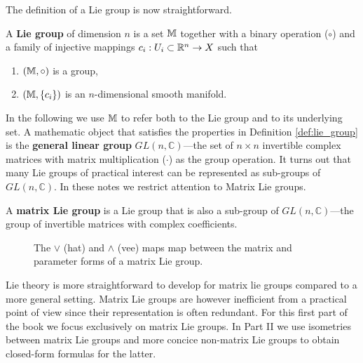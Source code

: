 
The definition of a Lie group is now straightforward.

\begin{important}
  \begin{definition}
    \label{def:lie_group}
    A \textbf{Lie group} of dimension $n$ is a set $\mathbb{M}$ together with a binary operation ($\circ$) and a family of injective mappings $c_i : U_i \subset \mathbb{R}^n \rightarrow X$ such that
    \begin{enumerate}
      \item $(\mathbb{M}, \circ)$ is a group,
      \item $(\mathbb{M}, \{ c_i \})$ is an $n$-dimensional smooth manifold.
    \end{enumerate}
  \end{definition}
\end{important}

In the following we use $\mathbb{M}$ to refer both to the Lie group and to its underlying set. A mathematic object that satisfies the properties in Definition \ref{def:lie_group} is the \textbf{general linear group} $GL(n, \mathbb{C})$---the set of $n \times n$ invertible complex matrices with matrix multiplication ($\cdot$) as the group operation. It turns out that many Lie groups of practical interest can be represented as sub-groups of $GL(n, \mathbb{C})$. In these notes we restrict attention to Matrix Lie groups.

\begin{definition}
  A \textbf{matrix Lie group} is a Lie group that is also a sub-group of $GL(n, \mathbb{C})$---the group of invertible matrices with complex coefficients.
\end{definition}

\begin{figure}
  \begin{center}
  \end{center}
  \caption{The $\vee$ (hat) and $\wedge$ (vee) maps map between the matrix and parameter forms of a matrix Lie group.}
\end{figure}

Lie theory is more straightforward to develop for matrix lie groups compared to a more general setting. Matrix Lie groups are however inefficient from a practical point of view since their representation is often redundant. For this first part of the book we focus exclusively on matrix Lie groups. In Part II we use isometries between matrix Lie groups and more concice non-matrix Lie groups to obtain closed-form formulas for the latter.
